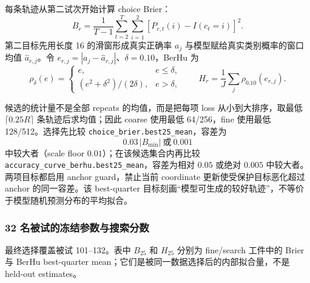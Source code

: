 每条轨迹从第二试次开始计算 choice Brier：
\begin{equation}
    B_r=\frac{1}{T-1}\sum_{t=2}^{T}\sum_{i=1}^{2}
    [P_{r,t}(i)-I(c_t=i)]^2.
    \label{eq:modelv13-brier}
\end{equation}
第二目标先用长度 16 的滑窗形成真实正确率 $a_j$ 与模型赋给真实类别概率的窗口均值 $\widehat a_{r,j}$。令 $e_{r,j}=|a_j-\widehat a_{r,j}|$、$\delta=0.10$，BerHu 为
\begin{equation}
    \rho_\delta(e)=
    \begin{cases}
        e,&e\leq\delta,\\
        (e^2+\delta^2)/(2\delta),&e>\delta,
    \end{cases}
    \qquad
    H_r=\frac{1}{J}\sum_j\rho_{0.10}(e_{r,j}).
    \label{eq:modelv13-berhu}
\end{equation}

候选的统计量不是全部 repeats 的均值，而是把每项 loss 从小到大排序，取最低 $\lceil0.25R\rceil$ 条轨迹后求均值；因此 coarse 使用最低 64/256，fine 使用最低 128/512。选择先比较 \texttt{choice\_brier.best25\_mean}，容差为
\begin{equation}
    0.03\,|B_{\min}|\ \text{或}\ 0.001
\end{equation}
中较大者（scale floor $0.01$）；在该候选集合内再比较 \texttt{accuracy\_curve\_berhu.best25\_mean}，容差为相对 $0.05$ 或绝对 $0.005$ 中较大者。两项目标都启用 anchor guard，禁止当前 coordinate 更新使受保护目标恶化超过 anchor 的同一容差。该 best-quarter 目标刻画“模型可生成的较好轨迹”，不等价于模型随机预测分布的平均拟合。


\subsubsection{32 名被试的冻结参数与搜索分数}

最终选择覆盖被试 101--132。表中 $B_{25}$ 和 $H_{25}$ 分别为 fine/search 工件中的 Brier 与 BerHu best-quarter mean；它们是被同一数据选择后的内部拟合量，不是 held-out estimates。

